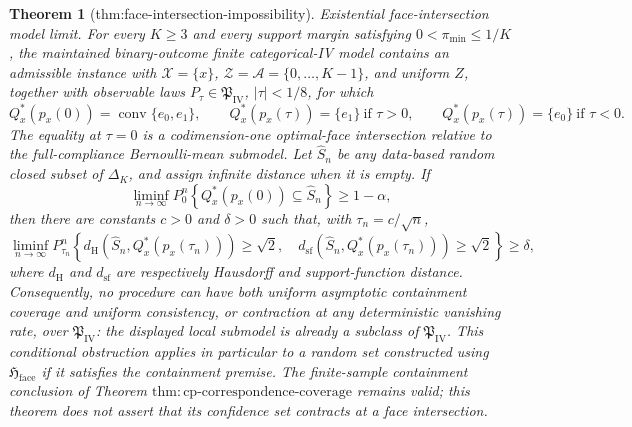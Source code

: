 \documentclass{article}
\newtheorem{theorem}{Theorem}
\begin{document}
\begin{theorem}[thm:face-intersection-impossibility]\label{thm:face-intersection-impossibility}
Existential face-intersection model limit.  For every \(K\geq3\) and every support margin satisfying \(0<\pi_{\min}\leq 1/K\), the maintained binary-outcome finite categorical-IV model contains an admissible instance with \(\mathcal X=\{x\}\), \(\mathcal Z=\mathcal A=\{0,\ldots,K-1\}\), and uniform \(Z\), together with observable laws \(P_\tau\in\mathfrak P_{\mathrm{IV}}\), \(|\tau|<1/8\), for which
\[
 Q_x^*(p_x(0))=\operatorname{conv}\{e_0,e_1\},\qquad
 Q_x^*(p_x(\tau))=\{e_1\}\ \text{if }\tau>0,
 \qquad
 Q_x^*(p_x(\tau))=\{e_0\}\ \text{if }\tau<0.
\]
The equality at \(\tau=0\) is a codimension-one optimal-face intersection relative to the full-compliance Bernoulli-mean submodel.  Let \(\widehat S_n\) be any data-based random closed subset of \(\Delta_K\), and assign infinite distance when it is empty.  If
\[
 \liminf_{n\to\infty}P_0^n\!\left\{Q_x^*(p_x(0))\subseteq\widehat S_n\right\}\geq1-\alpha,
\]
then there are constants \(c>0\) and \(\delta>0\) such that, with \(\tau_n=c/\sqrt n\),
\[
 \liminf_{n\to\infty}P_{\tau_n}^n\!\left\{
 d_{\mathrm H}\!\left(\widehat S_n,Q_x^*(p_x(\tau_n))\right)\geq\sqrt2,
 \quad
 d_{\mathrm{sf}}\!\left(\widehat S_n,Q_x^*(p_x(\tau_n))\right)\geq\sqrt2
 \right\}\geq\delta,
\]
where \(d_{\mathrm H}\) and \(d_{\mathrm{sf}}\) are respectively Hausdorff and support-function distance.  Consequently, no procedure can have both uniform asymptotic containment coverage and uniform consistency, or contraction at any deterministic vanishing rate, over \(\mathfrak P_{\mathrm{IV}}\): the displayed local submodel is already a subclass of \(\mathfrak P_{\mathrm{IV}}\).  This conditional obstruction applies in particular to a random set constructed using \(\mathfrak H_{\mathrm{face}}\) if it satisfies the containment premise.  The finite-sample containment conclusion of Theorem \(\mathrm{thm{:}cp\text{-}correspondence\text{-}coverage}\) remains valid; this theorem does not assert that its confidence set contracts at a face intersection.
\end{theorem}
\end{document}
